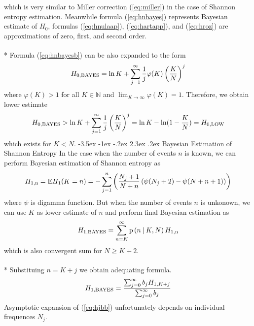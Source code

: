 \documentclass[a4paper,10pt]{article}
\makeatletter
\renewcommand\section{\@startsection {section}{1}{\z@}%
                                   {-3.5ex \@plus -1ex \@minus -.2ex}%
                                   {2.3ex \@plus.2ex}%
                                   {\large\bfseries}}
\makeatother
\begin{document}
which is very similar to Miller correction (\ref{eq:miller}) in the case of Shannon entropy estimation. Meanwhile formula (\ref{eq:hnbayes}) represents Bayesian estimate of $H_{0}$, formulas (\ref{eq:hnulaap}), (\ref{eq:hartapp}), and (\ref{eq:hroz}) are approximations of zero, first, and second order. \\
\\*
Formula (\ref{eq:hnbayesb}) can be also expanded to the form
\begin{equation} 
\label{eq:hnbayesbexp}
H_{0,\mbox{\scriptsize{BAYES}}} = \ln{K} + \sum_{j=1}^{\infty} \frac{1}{j} \varphi(K)\left(\frac{K}{N}\right)^{j}
\end{equation}
where $\varphi(K)>1$ for all $K \in \mathbb{N}$ and $\lim_{K \rightarrow \infty} \varphi(K) = 1$. Therefore, we obtain lower estimate
\begin{equation}
\label{eq:hnbayesbexplow}
H_{0,\mbox{\scriptsize{BAYES}}} > \ln{K} + \sum_{j=1}^{\infty} \frac{1}{j} \left(\frac{K}{N}\right)^{j} = \ln{K} - \ln(1 - \frac{K}{N}) = H_{0,\mbox{\scriptsize{LOW}}}
\end{equation}
which exists for $K < N$.
\section {Bayesian Estimation of Shannon Entropy}
In the case when the number of events $n$ is known, we can perform Bayesian estimation of Shannon entropy as
\begin{equation} 
\label{eq:hjednan}
H_{1,\mbox{\scriptsize{n}}} = \text{E}H_{1}(K=n) = -\sum_{j=1}^{n} \left( \frac{N_{j}+1}{N+n} \left( \psi(N_{j}+2) - \psi(N+n+1) \right) \right)
\end{equation}
where $\psi$ is digamma function. But when the number of events $n$ is unkonown, we can use $K$ as lower estimate of $n$ and perform final Bayesian estimation as
\begin{equation} 
\label{eq:hjednab}
H_{1,\mbox{\scriptsize{BAYES}}} = \sum_{n=K}^{\infty}{\text{p}\left(n \: \middle| \:K,N \right)H_{1,\mbox{\scriptsize{n}}}}
\end{equation}
which is also convergent sum for $N \ge K+2$. \\
\\*
Substituing $n=K+j$ we obtain adequating formula.
\begin{equation} 
\label{eq:hjbb}
H_{1,\mbox{\scriptsize{BAYES}}} = \frac{\sum_{j=0}^{\infty}b_{j}H_{1,K+j}}{\sum_{j=0}^{\infty}b_{j}}
\end{equation}
Asymptotic expansion of (\ref{eq:hjbb}) unfortunately depends on individual frequences $N_{j}$.
\end{document}
